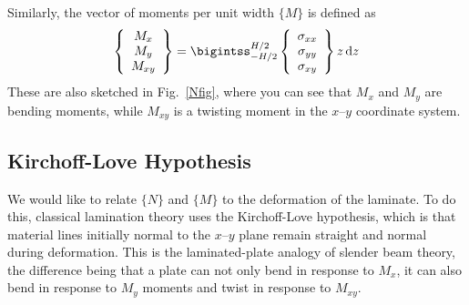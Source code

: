 \documentclass[11pt]{article}
\begin{document}
Similarly, the vector of moments per unit width $\{M\}$ is defined as
\begin{equation}
   \left\{ \begin{array}{c}
     M_x \\ M_y \\ M_{xy}
   \end{array} \right\}
   = \bigintss_{-H/2}^{H/2} 
    \left\{ \begin{array}{c}
           \sigma_{xx}  \\  \sigma_{yy}  \\   \sigma_{xy}
           \end{array} \right\}
      z \ud z
  \label{Mdef}
\end{equation}
These are also sketched in Fig.~\ref{Nfig}, where you can see that $M_x$ and $M_y$ are bending moments, while $M_{xy}$ is a twisting moment in the $x$--$y$ coordinate system.  



\subsection*{Kirchoff-Love Hypothesis}

We would like to relate $\{ N \}$ and $\{ M \}$ to the deformation of the laminate.  To do this, classical lamination theory uses the Kirchoff-Love hypothesis, which is that material lines initially normal to the $x$--$y$ plane remain straight and normal during deformation.  This is the laminated-plate analogy of slender beam theory, the difference being that a plate can not only bend in response to $M_x$, it can also bend in response to $M_y$ moments and twist in response to $M_{xy}$.  
\end{document}
